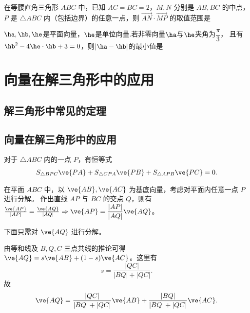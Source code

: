 \begin{example}
    
在等腰直角三角形 $ABC$ 中，已知 $AC = BC = 2$，$M, N$ 分别是 $AB, BC$ 的中点，$P$ 是 $\triangle ABC$ 内（包括边界）的任意一点，则 $\overrightarrow{AN} \cdot \overrightarrow{MP}$ 的取值范围是
\end{example}



\begin{example}
    \(\ha,\hb,\he\)是平面向量，\(\he\)是单位向量.若非零向量\(\ha\)与\(\he\)夹角为\(\dfrac{\pi}{3}\)，
    且有\(\hb^2-4\he\cdot\hb +3=0\)，则\(|\ha-\hb|\)的最小值是
\end{example}
















\clearpage

\section{向量在解三角形中的应用}
\subsection{解三角形中常见的定理}
\clearpage
\subsection{向量在解三角形中的应用}
\begin{theorem}[奔驰定理]
    对于 \(\triangle ABC\) 内的一点 \(P\)，有恒等式
    \[
    S_{\triangle BPC} \ve{PA} + S_{\triangle CPA} \ve{PB} + S_{\triangle APB} \ve{PC} = 0.
    \]
\end{theorem}


在平面 \(ABC\) 中，以 \(\ve{AB}, \ve{AC}\) 为基底向量，考虑对平面内任意一点 \(P\) 进行分解。
作出直线 \(AP\) 与 \(BC\) 的交点 \(Q\)，则有 \(\frac{\ve{AP}}{|AP|} = \frac{\ve{AQ}}{|AQ|} \Rightarrow \ve{AP} = \dfrac{|AP|}{|AQ|}\ve{AQ}\)。

下面只需对 \(\ve{AQ}\) 进行分解。

由等和线及 \(B, Q, C\) 三点共线的推论可得 \(\ve{AQ} = s\ve{AB} + (1-s)\ve{AC}\)。这里有
\[
s = \frac{|QC|}{|BQ| +|QC|}.
\]
故
\[
\ve{AQ} = \frac{|QC|}{|BQ|+|QC|} \ve{AB} + \frac{|BQ|}{|BQ|+|QC|} \ve{AC}.
\]

